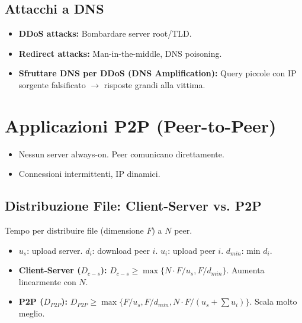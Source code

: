 \subsection{Attacchi a DNS}
\begin{itemize}
    \item \textbf{DDoS attacks:} Bombardare server root/TLD.
    \item \textbf{Redirect attacks:} Man-in-the-middle, DNS poisoning.
    \item \textbf{Sfruttare DNS per DDoS (DNS Amplification):} Query piccole con IP sorgente falsificato $\rightarrow$ risposte grandi alla vittima.
\end{itemize}

\section{Applicazioni P2P (Peer-to-Peer)}
\begin{itemize}
    \item Nessun server always-on. Peer comunicano direttamente.
    \item Connessioni intermittenti, IP dinamici.
\end{itemize}

\subsection{Distribuzione File: Client-Server vs. P2P}
Tempo per distribuire file (dimensione $F$) a $N$ peer.
\begin{itemize}
    \item $u_s$: upload server. $d_i$: download peer $i$. $u_i$: upload peer $i$. $d_{min}$: min $d_i$.
    \item \textbf{Client-Server ($D_{c-s}$):} $D_{c-s} \ge \max\{N \cdot F/u_s, F/d_{min}\}$. Aumenta linearmente con $N$.
    \item \textbf{P2P ($D_{P2P}$):} $D_{P2P} \ge \max\{F/u_s, F/d_{min}, N \cdot F/(u_s + \sum u_i)\}$. Scala molto meglio.
\end{itemize}

